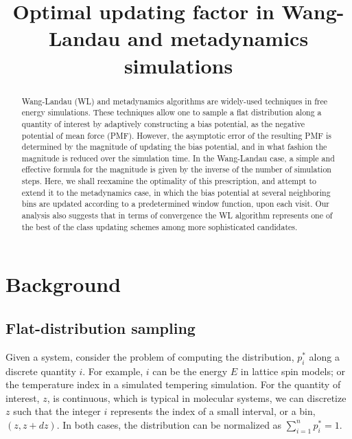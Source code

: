 \documentclass[reprint]{revtex4-1}
\begin{document}
\title{Optimal updating factor in Wang-Landau and metadynamics simulations}



\begin{abstract}
  Wang-Landau (WL) and metadynamics algorithms
  are widely-used techniques in free energy simulations.
  These techniques allow one to sample a flat distribution
  along a quantity of interest
  by adaptively constructing a bias potential,
  as the negative potential of mean force (PMF).
  However, the asymptotic error of the resulting PMF
  is determined by the magnitude of updating the bias potential,
  and in what fashion the magnitude is reduced
  over the simulation time.
  In the Wang-Landau case,
  a simple and effective formula for the magnitude
  is given by the inverse of the number of simulation steps.
  Here, we shall reexamine the optimality of this prescription,
  and attempt to extend it to the metadynamics case,
  in which the bias potential at several neighboring bins
  are updated according to a predetermined window function,
  upon each visit.
  Our analysis also suggests that in terms of convergence
  the WL algorithm represents one of the best of the class
  updating schemes among more sophisticated candidates.
\end{abstract}

\maketitle



\section{Background}



\subsection{Flat-distribution sampling}



Given a system,
consider the problem of computing
the distribution, $p^*_i$
along a discrete quantity $i$.
%
%
For example, $i$ can be the energy $E$
in lattice spin models; or the temperature index
in a simulated tempering simulation.
%
For the quantity of interest, $z$, is continuous,
which is typical in molecular systems,
we can discretize $z$
such that the integer $i$ represents
the index of a small interval, or a bin, $(z, z + dz)$.
%
In both cases,
the distribution can be normalized as
$\sum_{i = 1}^n p^*_i = 1$.
\end{document}
